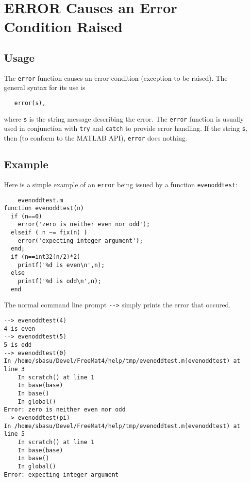 \section{ERROR Causes an Error Condition Raised}

\subsection{Usage}

The \verb|error| function causes an error condition (exception
to be raised).  The general syntax for its use is
\begin{verbatim}
   error(s),
\end{verbatim}
where \verb|s| is the string message describing the error.  The
\verb|error| function is usually used in conjunction with \verb|try|
and \verb|catch| to provide error handling.  If the string \verb|s|,
then (to conform to the MATLAB API), \verb|error| does nothing.
\subsection{Example}

Here is a simple example of an \verb|error| being issued by a function
\verb|evenoddtest|:
\begin{verbatim}
    evenoddtest.m
function evenoddtest(n)
  if (n==0)
    error('zero is neither even nor odd');
  elseif ( n ~= fix(n) )
    error('expecting integer argument');
  end;
  if (n==int32(n/2)*2)
    printf('%d is even\n',n);
  else
    printf('%d is odd\n',n);
  end
\end{verbatim}
The normal command line prompt \verb|-->| simply prints the error
that occured.
\begin{verbatim}
--> evenoddtest(4)
4 is even
--> evenoddtest(5)
5 is odd
--> evenoddtest(0)
In /home/sbasu/Devel/FreeMat4/help/tmp/evenoddtest.m(evenoddtest) at line 3
    In scratch() at line 1
    In base(base)
    In base()
    In global()
Error: zero is neither even nor odd
--> evenoddtest(pi)
In /home/sbasu/Devel/FreeMat4/help/tmp/evenoddtest.m(evenoddtest) at line 5
    In scratch() at line 1
    In base(base)
    In base()
    In global()
Error: expecting integer argument
\end{verbatim}
